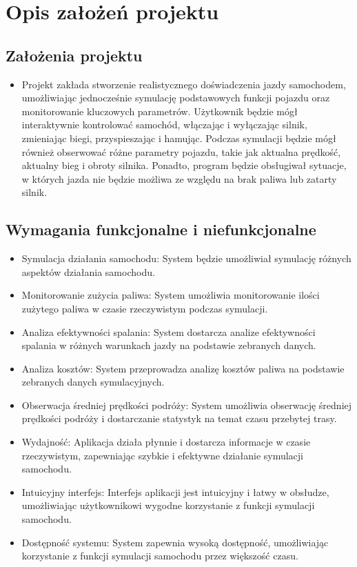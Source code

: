 \chapter{Opis założeń projektu}
\section{Założenia projektu}
\begin{itemize}
\item 
Projekt zakłada stworzenie realistycznego doświadczenia jazdy samochodem, umożliwiając jednocześnie symulację podstawowych funkcji pojazdu oraz monitorowanie kluczowych parametrów. Użytkownik będzie mógł interaktywnie kontrolować samochód, włączając i wyłączając silnik, zmieniając biegi, przyspieszając i hamując. Podczas symulacji będzie mógł również obserwować różne parametry pojazdu, takie jak aktualna prędkość, aktualny bieg i obroty silnika. Ponadto, program będzie obsługiwał sytuacje, w których jazda nie będzie możliwa ze względu na brak paliwa lub zatarty silnik. 
\end{itemize}

\section{Wymagania funkcjonalne i niefunkcjonalne}
\begin{itemize}
\item Symulacja działania samochodu: System będzie umożliwiał symulację różnych aspektów działania samochodu.
\item Monitorowanie zużycia paliwa: System umożliwia monitorowanie ilości zużytego paliwa w czasie rzeczywistym podczas symulacji.
\item Analiza efektywności spalania: System dostarcza analize efektywności spalania w różnych warunkach jazdy na podstawie zebranych danych.
\item Analiza kosztów: System przeprowadza analizę kosztów paliwa na podstawie zebranych danych symulacyjnych.
\item Obserwacja średniej prędkości podróży: System umożliwia obserwację średniej prędkości podróży i dostarczanie statystyk na temat czasu przebytej trasy.
\end{itemize}
\begin{itemize}
\item Wydajność: Aplikacja działa płynnie i dostarcza informacje w czasie rzeczywistym, zapewniając szybkie i efektywne działanie symulacji samochodu.
\item Intuicyjny interfejs: Interfejs aplikacji jest intuicyjny i łatwy w obsłudze, umożliwiając użytkownikowi wygodne korzystanie z funkcji symulacji samochodu.
\item Dostępność systemu: System zapewnia wysoką dostępność, umożliwiając korzystanie z funkcji symulacji samochodu przez większość czasu. 
\end{itemize}


